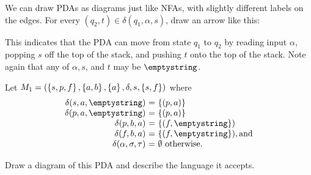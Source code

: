 \documentclass[twoside,letterpaper,openany]{book}
\begin{document}
\begin{discussion}
We can draw PDAs as diagrams just like NFAs, with slightly different labels on the edges. For every $(q_2, t) \in \delta(q_1, \alpha, s)$,   draw an arrow like this: 

\begin{center}
\end{center}

This indicates that the PDA can move from state $q_1$ to $q_2$ by reading input $\alpha$, popping $s$ off the top of the stack, and pushing $t$ onto the top of the stack. Note again that any of $\alpha, s$, and $t$ may be $\emptystring$.
\end{discussion}

\begin{exer}
Let $M_1 = (\left\lbrace s, p, f \right\rbrace, \left\lbrace a, b \right\rbrace, \left\lbrace a \right\rbrace, \delta, s, \left\lbrace s, f \right\rbrace)$ where 
\[\begin{array}{r@{\ =\ }l}
\delta(s, a, \emptystring)  &  \setdef{(p, a)}  \\
\delta(p, a, \emptystring) & \setdef{(p, a)} \\
\delta(p, b, a)  & \setdef{(f, \emptystring}) \\
\delta(f, b, a) & \setdef{(f, \emptystring}), \textrm{and} \\
\delta(\alpha, \sigma, \tau) & \emptyset \ \textrm{otherwise}.
\end{array}\]

Draw a diagram of this PDA and describe the language it accepts.
\end{exer}
\end{document}
